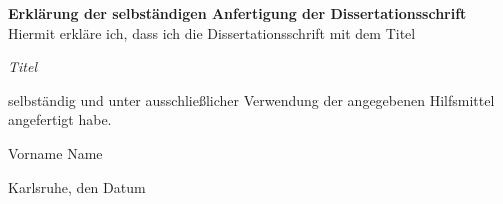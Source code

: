 \cleardoublepage
\thispagestyle{empty}
\null\vspace{10cm}
\noindent
{\sffamily \textbf{Erklärung der selbständigen Anfertigung der
Dissertationsschrift}}\\[1cm]

\noindent
Hiermit erkläre ich, dass ich die Dissertationsschrift mit dem Titel
%
\begin{center}
 \guillemotright
 \textit{Titel}\guillemotleft\\[1.5ex]
\end{center}
%
selbständig und unter ausschließlicher Verwendung der angegebenen Hilfsmittel\\
angefertigt habe.

\vspace{12ex}
\hrulefill\hspace{8cm}

Vorname Name

Karlsruhe, den Datum


